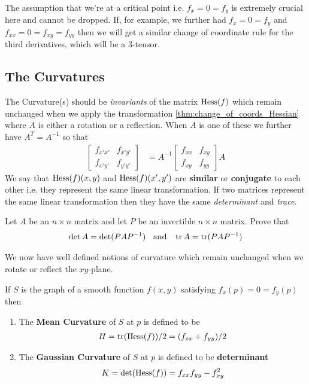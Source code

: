 \begin{remark}
  The assumption that we're at a critical point i.e. $ f_x = 0 = f_y$ is extremely crucial here and cannot be dropped. If, for example, we further had $ f_x = 0 = f_y$ and $ f_{xx} = 0 = f_{xy} = f_{yy}$ then we will get a similar change of coordinate rule for the third derivatives, which will be a 3-tensor.
\end{remark}












\subsection{The Curvatures}
The Curvature(s) should be \emph{invariants} of the matrix $ \operatorname{Hess}(f)$ which remain unchanged when we apply the transformation \eqref{thm:change_of_coords_Hessian} where $ A$ is either a rotation or a reflection. When $A$ is one of these we further have $A^T = A^{-1}$ so that
\begin{align*}
  \begin{bmatrix}
    f_{x'x'} & f_{x'y'} \\
    f_{x'y'} & f_{y'y'}
  \end{bmatrix}
    &=
     A^{-1}
    \begin{bmatrix}
      f_{xx} & f_{xy} \\
      f_{xy} & f_{yy}
    \end{bmatrix}
    A
\end{align*}
We say that $\operatorname{Hess}(f)(x,y)$ and $\operatorname{Hess}(f)(x',y')$ are {\bf similar} or {\bf conjugate} to each other i.e. they represent the same linear transformation. If two matrices represent the same linear transformation then they have the same \emph{determinant} and \emph{trace}.
\begin{ques}
  Let $A$ be an $n\times n$ matrix and let $P$ be an invertible $n \times n$ matrix. Prove that
  \begin{align*}
    \det A = \det (P A P^{-1}) \mbox{ \: and \: }\operatorname{tr} A = \operatorname{tr}(P A P^{-1})
  \end{align*}
\end{ques}
We now have well defined notions of curvature which remain unchanged when we rotate or reflect the $xy$-plane.
\begin{definition}
  If $ S$ is the graph of a smooth function $ f(x,y)$ satisfying $ f_x(p) = 0 = f_y(p)$ then
  \begin{enumerate}
    \item The \textbf{Mean Curvature} of $ S$ at $ p$ is defined to be
    \begin{align*}
      H = \operatorname{tr}(\operatorname{Hess}(f))/2 = (f_{xx} + f_{yy})/2
    \end{align*}
    \item The \textbf{Gaussian Curvature} of $ S$ at $ p$ is defined to be \textbf{determinant}
    \begin{align*}
      K = \det(\operatorname{Hess}(f)) = f_{xx}f_{yy} - f_{xy}^2
    \end{align*}
  \end{enumerate}
\end{definition}


